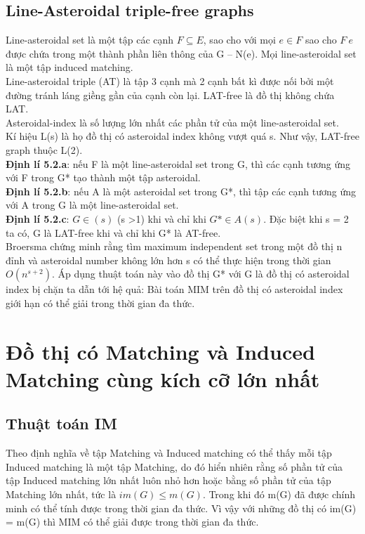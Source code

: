 \documentclass[14pt,a4paper]{extreport}
\begin{document}
\section{Line-Asteroidal triple-free graphs}
Line-asteroidal set là một tập các cạnh $ F \subseteq E $, sao cho với mọi $ e \in F$ sao cho $ F \ {e} $ được chứa trong một thành phần liên thông của G – N(e). Mọi line-asteroidal set là một tập induced matching.\\
Line-asteroidal triple (AT) là tập 3 cạnh mà 2 cạnh bất kì được nối bởi một đường tránh láng giềng gần của cạnh còn lại. LAT-free là đồ thị không chứa LAT.\\
Asteroidal-index là số lượng lớn nhất các phần tử của một line-asteroidal set.\\
Kí hiệu L(s) là họ đồ thị có asteroidal index không vượt quá s. Như vậy, LAT-free graph thuộc L(2).\\

\textbf{Định lí 5.2.a}: nếu F là một line-asteroidal set trong G, thì các cạnh tương ứng với F trong G* tạo thành một tập asteroidal.\\

\textbf{Định lí 5.2.b}: nếu A là một asteroidal set trong G*, thì tập các cạnh tương ứng với A trong G là một line-asteroidal set.\\

\textbf{Định lí 5.2.c}: $ G \in (s) $ (s >1) khi và chỉ khi $ G* \in A(s)$. Đặc biệt khi s = 2 ta có, G là LAT-free khi và chỉ khi G* là AT-free.\\

Broersma chứng minh rằng tìm maximum independent set trong một đồ thị n đỉnh và asteroidal number không lớn hơn s có thể thực hiện trong thời gian $ O(n^{s+2}) $. Áp dụng thuật toán này vào đồ thị G* với G là đồ thị có asteroidal index bị chặn ta dẫn tới hệ quả: Bài toán MIM trên đồ thị có asteroidal index giới hạn có thể giải trong thời gian đa thức. 

\chapter{Đồ thị có Matching và Induced Matching cùng kích cỡ lớn nhất}

\section{Thuật toán IM}
Theo định nghĩa về tập Matching  và Induced matching có thể thấy mỗi tập  Induced matching là một tập Matching, do đó hiển nhiên rằng số phần tử của tập Induced matching lớn nhất luôn nhỏ hơn hoặc bằng số phần tử của tập Matching lớn nhất, tức là $ im(G) \leq m(G) $. Trong khi đó m(G) đã được chính minh có thể tính được trong thời gian đa thức. Vì vậy với những đồ thị có im(G) = m(G) thì MIM có thể giải được trong thời gian đa thức.
\end{document}
